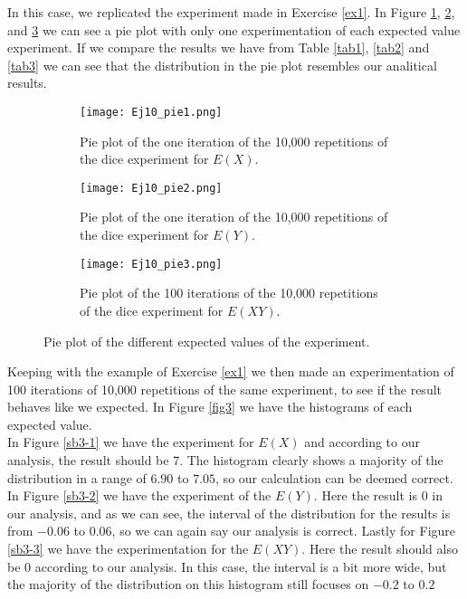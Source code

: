 \documentclass{article}
\begin{document}
In this case, we replicated the experiment made in Exercise \ref{ex1}. In Figure \ref{sb2-1}, \ref{sb2-2}, and \ref{sb2-3} we can see a pie plot with only one experimentation of each expected value experiment. If we compare the results we have from Table \ref{tab1}, \ref{tab2} and \ref{tab3} we can see that the distribution in the pie plot resembles our analitical results. \\

\begin{figure}[]
\begin{subfigure}{.5\textwidth}
  \centering
  \texttt{[image: Ej10\_pie1.png]}  
  \caption{Pie plot of the one iteration of the 10,000 repetitions of the dice experiment for $E(X)$. }
  \label{sb2-1}
\end{subfigure}\hspace{5mm}%
\begin{subfigure}{.5\textwidth}
  \centering
  \texttt{[image: Ej10\_pie2.png]}  
  \caption{Pie plot of the one iteration of the 10,000 repetitions of the dice experiment for $E(Y)$. }
  \label{sb2-2}
\end{subfigure}\hspace{5mm}%
\newline
\begin{subfigure}{1\textwidth}
  \centering
  \texttt{[image: Ej10\_pie3.png]}  
  \caption{Pie plot of the 100 iterations of the 10,000 repetitions of the dice experiment for $E(XY)$.}
  \label{sb2-3}
\end{subfigure}
	\caption{Pie plot of the different expected values of the experiment.}
\label{fig2}
\end{figure}

Keeping with the example of Exercise \ref{ex1} we then made an experimentation of 100 iterations of 10,000 repetitions of the same experiment, to see if the result behaves like we expected. In Figure  \ref{fig3} we have the histograms of each expected value. \\

In Figure \ref{sb3-1} we have the experiment for $E(X)$ and according to our analysis, the result should be 7. The histogram clearly shows a majority of the distribution in a range of $6.90$ to $7.05$, so our calculation can be deemed correct. In Figure \ref{sb3-2} we have the experiment of the $E(Y)$. Here the result is 0 in our analysis, and as we can see, the interval of the distribution for the results is from $-0.06$ to $0.06$, so we can again say our analysis is correct. Lastly for Figure \ref{sb3-3} we have the experimentation for the $E(XY)$. Here the result should also be $0$ according to our analysis. In this case, the interval is a bit more wide, but the majority of the distribution on this histogram still focuses on $-0.2$ to $0.2$
\end{document}
